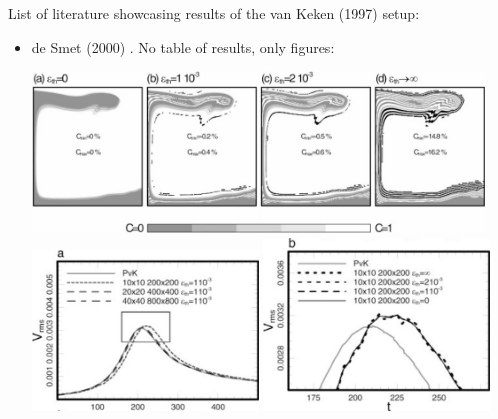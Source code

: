 List of literature showcasing results of the van Keken \etal (1997) \cite{vaks97} setup:
\begin{itemize}
\item de Smet \etal (2000) \cite{devv00a}. No table of results, only figures:
\begin{center}
\includegraphics[width=12cm]{images/benchmark_vaks97/devv00a_1}\\
\includegraphics[width=6cm]{images/benchmark_vaks97/devv00a_2}
\includegraphics[width=6cm]{images/benchmark_vaks97/devv00a_3}
\end{center}


\end{itemize}
